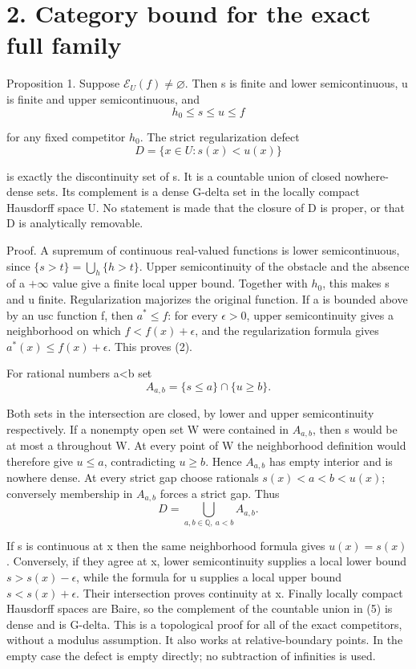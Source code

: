 \documentclass[11pt,a4paper]{article}
\begin{document}
\section*{2. Category bound for the exact full family}

Proposition 1. Suppose \(\mathcal E_U(f)\ne\varnothing\). Then s is finite and lower semicontinuous, u is finite and upper semicontinuous, and
\[
h_0\leq s\leq u\leq f
\tag{2}
\]

for any fixed competitor \(h_0\). The strict regularization defect
\[
D=\{x\in U:s(x)<u(x)\}
\tag{3}
\]

is exactly the discontinuity set of s. It is a countable union of closed nowhere-dense sets. Its complement is a dense G-delta set in the locally compact Hausdorff space U. No statement is made that the closure of D is proper, or that D is analytically removable.

Proof. A supremum of continuous real-valued functions is lower semicontinuous, since \(\{s>t\}=\bigcup_h\{h>t\}\). Upper semicontinuity of the obstacle and the absence of a \(+\infty\) value give a finite local upper bound. Together with \(h_0\), this makes s and u finite. Regularization majorizes the original function. If a is bounded above by an usc function f, then \(a^*\leq f\): for every \(\epsilon>0\), upper semicontinuity gives a neighborhood on which \(f<f(x)+\epsilon\), and the regularization formula gives \(a^*(x)\leq f(x)+\epsilon\). This proves (2).

For rational numbers a<b set
\[
A_{a,b}=\{s\leq a\}\cap\{u\geq b\}.
\tag{4}
\]

Both sets in the intersection are closed, by lower and upper semicontinuity respectively. If a nonempty open set W were contained in \(A_{a,b}\), then s would be at most a throughout W. At every point of W the neighborhood definition would therefore give \(u\leq a\), contradicting \(u\geq b\). Hence \(A_{a,b}\) has empty interior and is nowhere dense. At every strict gap choose rationals \(s(x)<a<b<u(x)\); conversely membership in \(A_{a,b}\) forces a strict gap. Thus
\[
D=\bigcup_{a,b\in\mathbb Q,\ a<b} A_{a,b}.
\tag{5}
\]

If s is continuous at x then the same neighborhood formula gives \(u(x)=s(x)\). Conversely, if they agree at x, lower semicontinuity supplies a local lower bound \(s>s(x)-\epsilon\), while the formula for u supplies a local upper bound \(s<s(x)+\epsilon\). Their intersection proves continuity at x. Finally locally compact Hausdorff spaces are Baire, so the complement of the countable union in (5) is dense and is G-delta. This is a topological proof for all of the exact competitors, without a modulus assumption. It also works at relative-boundary points. In the empty case the defect is empty directly; no subtraction of infinities is used.
\end{document}
